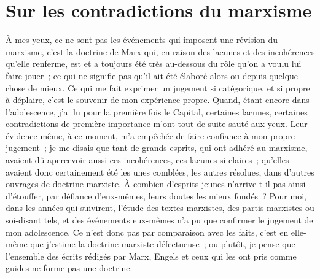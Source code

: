 \documentclass[french,twoside]{book} %
\begin{document}
\begin{center}
\noindent \centerline{}
\end{center}

\section[{Sur les contradictions du marxisme}]{Sur les contradictions du marxisme}\renewcommand{\leftmark}{Sur les contradictions du marxisme}

\noindent \par
À mes yeux, ce ne sont pas les événements qui imposent une révision du marxisme, c'est la doctrine de Marx qui, en raison des lacunes et des incohérences qu'elle renferme, est et a toujours été très au-dessous du rôle qu'on a voulu lui faire jouer ; ce qui ne signifie pas qu'il ait été élaboré alors ou depuis quelque chose de mieux. Ce qui me fait exprimer un jugement si catégorique, et si propre à déplaire, c'est le souvenir de mon expérience propre. Quand, étant encore dans l'adolescence, j'ai lu pour la première fois le Capital, certaines lacunes, certaines contradictions de première importance m'ont tout de suite sauté aux yeux. Leur évidence même, à ce moment, m'a empêchée de faire confiance à mon propre jugement ; je me disais que tant de grands esprits, qui ont adhéré au marxisme, avaient dû apercevoir aussi ces incohérences, ces lacunes si claires ; qu'elles avaient donc certainement été les unes comblées, les autres résolues, dans d'autres ouvrages de doctrine marxiste. À combien d'esprits jeunes n'arrive-t-il pas ainsi d'étouffer, par défiance d'eux-mêmes, leurs doutes les mieux fondés ? Pour moi, dans les années qui suivirent, l'étude des textes marxistes, des partis marxistes ou soi-disant tels, et des événements eux-mêmes n'a pu que confirmer le jugement de mon adolescence. Ce n'est donc pas par comparaison avec les faits, c'est en elle-même que j'estime la doctrine marxiste défectueuse ; ou plutôt, je pense que l'ensemble des écrits rédigés par Marx, Engels et ceux qui les ont pris comme guides ne forme pas une doctrine.\par
\end{document}
